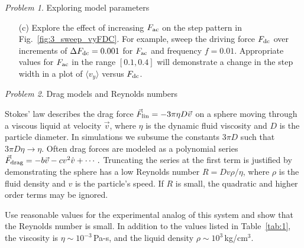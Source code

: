 \documentclass[preprint,showpacs,preprintnumbers,amsmath,amssymb,aps,prb]{revtex4-1}
\theoremstyle{remark}
\newtheorem{problem}{Problem}
\begin{document}
\begin{problem}{Exploring model parameters}
\begin{enumerate}
\item[(c)] Explore the effect of increasing  $F_{\rm ac}$ on the step pattern in Fig.~\ref{fig:3_sweep_vyFDC}.
  For example, sweep the driving force $F_{\rm dc}$
  over increments of $\Delta F_{\rm dc} = 0.001$
  for    $F_{\rm ac}$ and frequency $f=0.01$.
  Appropriate values for 
  $F_{\rm ac}$ in the range $[0.1, 0.4]$
  will demonstrate a change in the step width
  in a plot of $\langle v_y \rangle$ versus $F_{\rm dc}$.
  
  \end{enumerate}
  \end{problem}
  
  \begin{problem}{Drag models and Reynolds numbers}
\label{ex:reynolds}

\noindent Stokes' law describes the drag force
  $\vec{F}_{\rm lin} = -3 \pi \eta D \vec{v}$ 
  on a sphere
  moving through a viscous liquid at velocity $\vec{v}$,
  where $\eta$ is the dynamic fluid viscosity and 
  $D$ is the particle diameter.\cite{Taylor2005}
  In simulations we
  subsume the constants $3 \pi D$
  such that $3 \pi D \eta \rightarrow \eta $.
  Often drag forces are
  modeled as a polynomial series\cite{Taylor2005}
$\vec{F}_{\rm drag} = -b \vec{v} - c v^2 \hat{v} + \cdots\,.$
Truncating the series at the first term
  is justified by demonstrating the sphere
  has a low Reynolds number  
  $R = D v \rho / \eta$,
  where $\rho$ is the fluid density and $v$ is the particle's speed.
  If $R$ is small, the quadratic and higher order terms
  may be ignored.

Use reasonable values for the
  experimental analog of this system and show 
that the Reynolds number is small.
In addition to the values listed in Table~\ref{tab:1},
the viscosity is $\eta \sim 10^{-3}$\,Pa-s,\cite{Volpe2013}
and 
the liquid density 
$\rho \sim 10^3$\,kg/cm$^3$.\cite{asce}

\end{problem}


  
\end{document}
